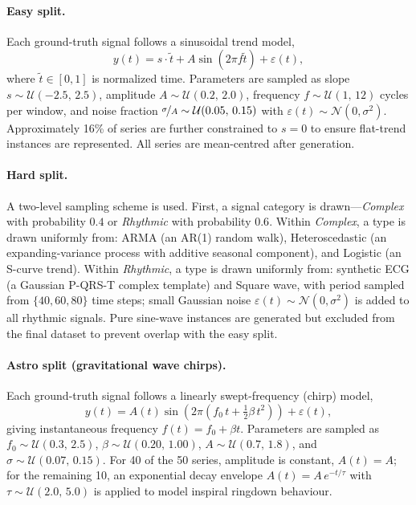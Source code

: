 \documentclass{article}
\begin{document}
\paragraph{Easy split.}
Each ground-truth signal follows a sinusoidal trend model,
\begin{equation}
    y(t) = s \cdot \tilde{t} + A\sin(2\pi f \tilde{t}) + \varepsilon(t),
\end{equation}
where $\tilde{t} \in [0,1]$ is normalized time. Parameters are sampled as
slope $s \sim \mathcal{U}(-2.5,\, 2.5)$, amplitude $A \sim \mathcal{U}(0.2,\,
2.0)$, frequency $f \sim \mathcal{U}(1,\, 12)$ cycles per window, and noise
fraction $\nicefrac{\sigma}{A} \sim \mathcal{U}(0.05,\, 0.15)$ with
$\varepsilon(t) \sim \mathcal{N}(0, \sigma^2)$. Approximately 16\% of series
are further constrained to $s = 0$ to ensure flat-trend instances are
represented. All series are mean-centred after generation.

\paragraph{Hard split.}
A two-level sampling scheme is used. First, a signal category is
drawn---\textit{Complex} with probability $0.4$ or \textit{Rhythmic} with
probability $0.6$. Within \textit{Complex}, a type is drawn uniformly from:
ARMA (an AR(1) random walk), Heteroscedastic (an expanding-variance process
with additive seasonal component), and Logistic (an S-curve trend). Within
\textit{Rhythmic}, a type is drawn uniformly from: synthetic ECG (a Gaussian
P-QRS-T complex template) and Square wave, with period sampled from $\{40, 60,
80\}$ time steps; small Gaussian noise $\varepsilon(t) \sim \mathcal{N}(0,
\sigma^2)$ is added to all rhythmic signals. Pure sine-wave instances are
generated but excluded from the final dataset to prevent overlap with the easy
split.

\paragraph{Astro split (gravitational wave chirps).}
Each ground-truth signal follows a linearly swept-frequency (chirp) model,
\begin{equation}
    y(t) = A(t)\sin\!\left(2\pi\!\left(f_0\, t +
    \tfrac{1}{2}\beta\, t^2\right)\right) + \varepsilon(t),
\end{equation}
giving instantaneous frequency $f(t) = f_0 + \beta t$. Parameters are sampled
as $f_0 \sim \mathcal{U}(0.3,\, 2.5)$, $\beta \sim \mathcal{U}(0.20,\, 1.00)$,
$A \sim \mathcal{U}(0.7,\, 1.8)$, and $\sigma \sim \mathcal{U}(0.07,\, 0.15)$.
For 40 of the 50 series, amplitude is constant, $A(t) = A$; for the remaining
10, an exponential decay envelope $A(t) = A\,e^{-t/\tau}$ with $\tau \sim
\mathcal{U}(2.0,\, 5.0)$ is applied to model inspiral ringdown behaviour.
\end{document}
